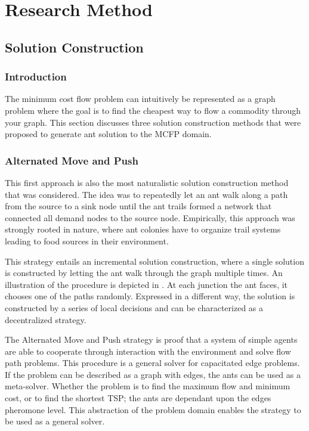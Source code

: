 \graphicspath{{chapters/chapter4/}}
\chapter{Research Method}

\section{Solution Construction}

\subsection{Introduction}
The minimum cost flow problem can intuitively be represented as a graph problem where the goal is to find the cheapest way to flow a commodity through your graph. This section discusses three solution construction methods that were proposed to generate ant solution to the MCFP domain.

\subsection{Alternated Move and Push}\label{sec:alternated_move_and_push}

This first approach is also the most naturalistic solution construction method that was considered. The idea was to repeatedly let an ant walk along a path from the source to a sink node until the ant trails formed a network that connected all demand nodes to the source node. Empirically, this approach was strongly rooted in nature, where ant colonies have to organize trail systems leading to food sources in their environment.

This strategy entails an incremental solution construction, where a single solution is constructed by letting the ant walk through the graph multiple times. An illustration of the procedure is depicted in . At each junction the ant faces, it chooses one of the paths randomly. Expressed in a different way, the solution is constructed by a series of local decisions and can be characterized as a decentralized strategy.



The Alternated Move and Push strategy is proof that a system of simple agents are able to cooperate through interaction with the environment and solve flow path problems. This procedure is a general solver for capacitated edge problems. If the problem can be described as a graph with edges, the ants can be used as a meta-solver. Whether the problem is to find the maximum flow and minimum cost, or to find the shortest TSP; the ants are dependant upon the edges pheromone level. This abstraction of the problem domain enables the strategy to be used as a general solver.

